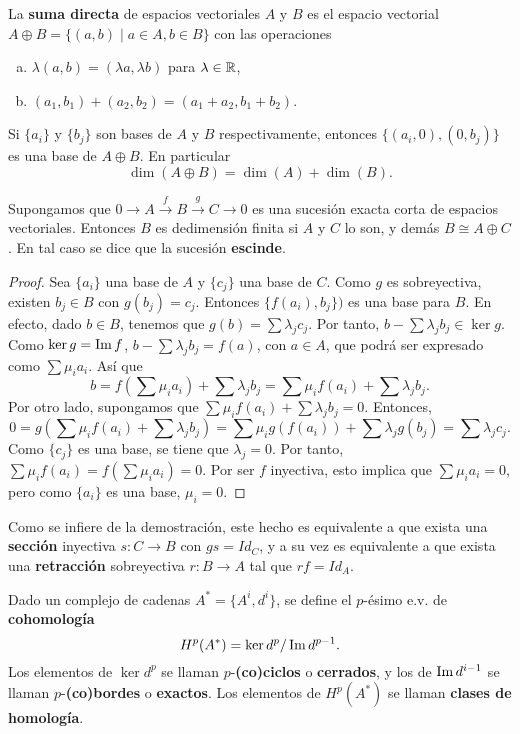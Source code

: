 \documentclass[CV.tex]{subfiles}
\begin{document}
\begin{defi}
La \textbf{suma directa} de espacios vectoriales $A$ y $B$ es el espacio vectorial $A\oplus B=\{(a,b)\mid a\in A,b\in B\}$ con las operaciones 
\begin{enumerate}[a.]
\item $\lambda(a,b)=(\lambda a,\lambda b)$ para $\lambda\in\mathbb{R}$,
\item $(a_1,b_1)+(a_2,b_2)=(a_1+a_2,b_1+b_2)$.
\end{enumerate}
\end{defi}

Si $\{a_i\}$ y $\{b_j\}$ son bases de $A$ y $B$ respectivamente, entonces $\{(a_i,0), (0,b_j)\}$ es una base de $A\oplus B$. En particular
\[
\dim(A\oplus B)=\dim(A)+\dim(B).
\]
\begin{lemma}
Supongamos que $0\to A\overset{f}{\to}B\overset{g}{\to}C\to 0$ es una sucesión exacta corta de espacios vectoriales. Entonces $B$ es dedimensión finita si $A$ y $C$ lo son, y demás $B\cong A\oplus C$. En tal caso se dice que la sucesión \textbf{escinde}.
\end{lemma}
\begin{proof}
Sea $\{a_i\}$ una base de $A$ y $\{c_j\}$ una base de $C$. Como $g$ es sobreyectiva, existen $b_j\in B$ con $g(b_j)=c_j$. Entonces $\{f(a_i),b_j\})$ es una base para $B$. En efecto, dado $b\in B$, tenemos que $g(b)=\sum\lambda_jc_j$. Por tanto, $b-\sum\lambda_jb_j\in\ker{g}$. Como $\ker{g}=\operatorname{Im}{f}$, $b-\sum\lambda_jb_j=f(a)$, con $a\in A$, que podrá ser expresado como $\sum\mu_ia_i$. Así que
\[
b=f\left(\sum\mu_ia_i\right)+\sum\lambda_jb_j=\sum\mu_if(a_i)+\sum\lambda_jb_j.
\]
Por otro lado, supongamos que $\sum\mu_if(a_i)+\sum\lambda_jb_j=0$. Entonces, 
\[
0=g\left(\sum\mu_if(a_i)+\sum\lambda_jb_j\right)=\sum\mu_ig(f(a_i))+\sum\lambda_jg(b_j)=\sum\lambda_j c_j.
\]
Como $\{c_j\}$ es una base, se tiene que $\lambda_j=0$. Por tanto, $\sum\mu_if(a_i)=f\left(\sum\mu_ia_i\right)=0$. Por ser $f$ inyectiva, esto implica que $\sum\mu_ia_i=0$, pero como $\{a_i\}$ es una base, $\mu_i=0$.  
\end{proof}

Como se infiere de la demostración, este hecho es equivalente a que exista una \textbf{sección} inyectiva $s:C\to B$ con $gs=Id_C$, y a su vez es equivalente a que exista una \textbf{retracción} sobreyectiva $r:B\to A$ tal que $rf=Id_A$.

\begin{defi}
Dado un complejo de cadenas $A^*=\{A^i,d^i\}$, se define el $p$-ésimo e.v. de \textbf{cohomología}
\[
H^p(A^*)=\ker{d^p}/\operatorname{Im}{d^{p-1}}.
\]
Los elementos de $\ker{d^p}$ se llaman $p$-\textbf{(co)ciclos} o \textbf{cerrados}, y los de $\operatorname{Im}{d^{i-1}}$ se llaman $p$-\textbf{(co)bordes} o \textbf{exactos}. Los elementos de $H^p(A^*)$ se llaman \textbf{clases de homología}.
\end{defi}
\end{document}

